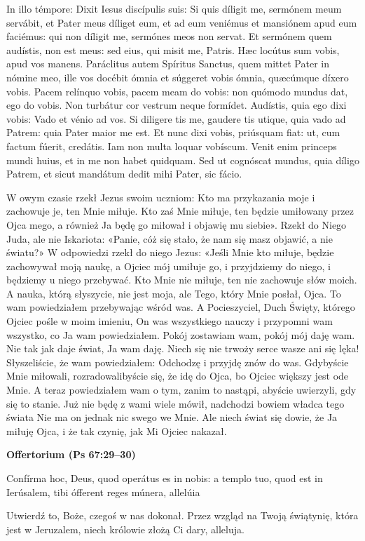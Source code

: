 \documentclass[10pt,a5paper]{book}
\newcommand{\oremus}[3]{\medskip\centerline{\textbf{#1}}\medskip
	\begin{sloppypar}
		\begin{paracol}{2}
			\setlength{\columnsep}{0em}
			\begin{leftcolumn}
				#2
			\end{leftcolumn}
			\begin{rightcolumn}
				#3
			\end{rightcolumn}
		\end{paracol}
	\end{sloppypar}}
\newcommand{\oremuss}[2]{
	\begin{sloppypar}
		\begin{paracol}{2}
			\setlength{\columnsep}{0em}
			\begin{leftcolumn}
				#1
			\end{leftcolumn}
			\begin{rightcolumn}
				#2
			\end{rightcolumn}
		\end{paracol}
	\end{sloppypar}}
\begin{document}
				\oremuss{
					In illo témpore: Dixit Iesus discípulis suis: Si quis díligit me, sermónem meum servábit, et Pater meus díliget eum, et ad eum veniémus et mansiónem apud eum faciémus: qui non díligit me, sermónes meos non servat. Et sermónem quem audístis, non est meus: sed eius, qui misit me, Patris. Hæc locútus sum vobis, apud vos manens. Paráclitus autem Spíritus Sanctus, quem mittet Pater in nómine meo, ille vos docébit ómnia et súggeret vobis ómnia, quæcúmque díxero vobis. Pacem relínquo vobis, pacem meam do vobis: non quómodo mundus dat, ego do vobis. Non turbátur cor vestrum neque formídet. Audístis, quia ego dixi vobis: Vado et vénio ad vos. Si diligere tis me, gaudere tis utique, quia vado ad Patrem: quia Pater maior me est. Et nunc dixi vobis, priúsquam fiat: ut, cum factum fúerit, credátis. Iam non multa loquar vobíscum. Venit enim princeps mundi huius, et in me non habet quidquam. Sed ut cognóscat mundus, quia díligo Patrem, et sicut mandátum dedit mihi Pater, sic fácio.}{\vspace*{-3pt}
					W owym czasie rzekł Jezus swoim uczniom: Kto ma przykazania moje i zachowuje je, ten Mnie miłuje. Kto zaś Mnie miłuje, ten będzie umiłowany przez Ojca mego, a również Ja będę go miłował i objawię mu siebie».  Rzekł do Niego Juda, ale nie Iskariota: «Panie, cóż się stało, że nam się masz objawić, a nie światu?» W odpowiedzi rzekł do niego Jezus: «Jeśli Mnie kto miłuje, będzie zachowywał moją naukę, a Ojciec mój umiłuje go, i przyjdziemy do niego, i będziemy u niego przebywać. Kto Mnie nie miłuje, ten nie zachowuje słów moich. A nauka, którą słyszycie, nie jest moja, ale Tego, który Mnie posłał, Ojca. To wam powiedziałem przebywając wśród was. A Pocieszyciel, Duch Święty, którego Ojciec pośle w moim imieniu, On was wszystkiego nauczy i przypomni wam wszystko, co Ja wam powiedziałem.  Pokój zostawiam wam, pokój mój daję wam. Nie tak jak daje świat, Ja wam daję. Niech się nie trwoży serce wasze ani się lęka!  Słyszeliście, że wam powiedziałem: Odchodzę i przyjdę znów do was. Gdybyście Mnie miłowali, rozradowalibyście się, że idę do Ojca, bo Ojciec większy jest ode Mnie. A teraz powiedziałem wam o tym, zanim to nastąpi, abyście uwierzyli, gdy się to stanie. Już nie będę z wami wiele mówił, nadchodzi bowiem władca tego świata Nie ma on jednak nic swego we Mnie. Ale niech świat się dowie, że Ja miłuję Ojca, i że tak czynię, jak Mi Ojciec nakazał.}
				
				\oremus{Offertorium (Ps 67:29--30)}{
					Confírma hoc, Deus, quod operátus es in nobis: a templo tuo, quod est in Ierúsalem, tibi ófferent reges múnera, allelúia}{
					Utwierdź to, Boże, czegoś w nas dokonał. Przez wzgląd na Twoją świątynię, która jest w Jeruzalem, niech królowie złożą Ci dary, alleluja.}
				
\end{document}
